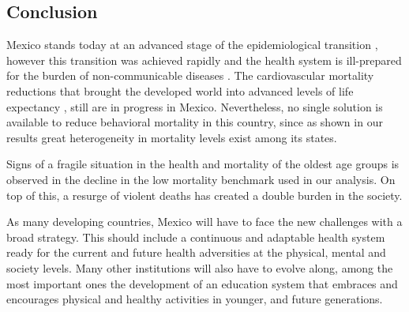 \documentclass{bmcart}
\begin{document}

\subsection*{Conclusion}
Mexico stands today at an advanced stage of the epidemiological transition \cite{gomez2016dissonant}, however this transition was achieved rapidly and the health system is ill-prepared for the burden of non-communicable diseases \cite{rivera2002epidemiological}. The cardiovascular mortality reductions that brought the developed world into advanced levels of life expectancy \cite{leon2011trends}, still are in progress in Mexico. Nevertheless, no single solution is available to reduce behavioral mortality in this country, since as shown in our results great heterogeneity in mortality levels exist among its states. 

Signs of a fragile situation in the health and mortality of the oldest age groups is observed in the decline in the low mortality benchmark used in our analysis. On top of this, a resurge of violent deaths \cite{gamlin2015violence,Aburto2015} has created a double burden in the society. 

As many developing countries, Mexico will have to face the new challenges with a broad strategy. This should include a continuous and adaptable health system ready for the current and future health adversities at the physical, mental and society levels. Many other institutions will also have to evolve along, among the most important ones the development of an education system that embraces and encourages physical and healthy activities in younger, and future generations.


\end{document}
